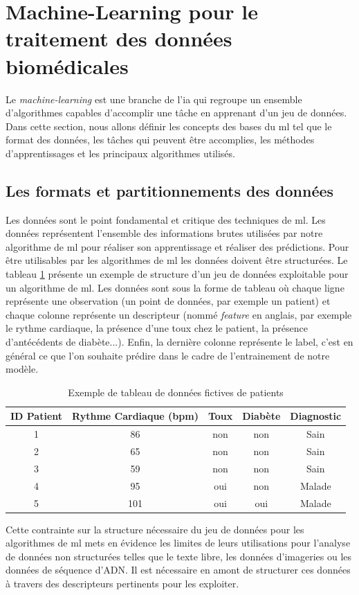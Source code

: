\section{Machine-Learning pour le traitement des données biomédicales}
Le \textit{machine-learning} est une branche de l'\gls{ia} qui regroupe un ensemble d'algorithmes capables d'accomplir une tâche en apprenant d'un jeu de données. Dans cette section, nous allons définir les concepts des bases du \gls{ml} tel que le format des données, les tâches qui peuvent être accomplies, les méthodes d'apprentissages et les principaux algorithmes utilisés.

\subsection{Les formats et partitionnements des données}
Les données sont le point fondamental et critique des techniques de \gls{ml}. Les données représentent l'ensemble des informations brutes utilisées par notre algorithme de \gls{ml} pour réaliser son apprentissage et réaliser des prédictions. Pour être utilisables par les algorithmes de \gls{ml} les données doivent être structurées. Le tableau \ref{table:dataset_intro} présente un exemple de structure d'un jeu de données exploitable pour un algorithme de \gls{ml}. Les données sont sous la forme de tableau où chaque ligne représente une observation (un point de données, par exemple un patient) et chaque colonne représente un descripteur (nommé \textit{feature} en anglais, par exemple le rythme cardiaque, la présence d'une toux chez le patient, la présence d'antécédents de diabète...). Enfin, la dernière colonne représente le label, c'est en général ce que l'on souhaite prédire dans le cadre de l'entrainement de notre modèle.
\begin{table}[!ht]
\centering
\begin{tabular}{|c|c|c|c|c|} 
 \hline
 ID Patient & Rythme Cardiaque (bpm) & Toux & Diabète & Diagnostic \\
 \hline
 1 & 86 & non & non & Sain \\ 
 2 & 65 & non & non & Sain \\ 
 3 & 59 & non & non & Sain \\ 
 4 & 95 & oui & non & Malade \\ 
 5 & 101 & oui & oui & Malade\\ 
 \hline
\end{tabular}
\caption{Exemple de tableau de données fictives de patients}
\label{table:dataset_intro}
\end{table}
Cette contrainte sur la structure nécessaire du jeu de données pour les algorithmes de \gls{ml} mets en évidence les limites de leurs utilisations pour l'analyse de données non structurées telles que le texte libre, les données d'imageries ou les données de séquence d'ADN. Il est nécessaire en amont de structurer ces données à travers des descripteurs pertinents pour les exploiter.

